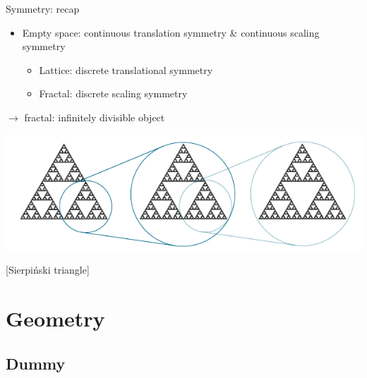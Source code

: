 \documentclass[xcolor=x11names,compress,professionalfonts]{beamer}
\renewcommand{\(}{\begin{columns}}
\renewcommand{\)}{\end{columns}}
\newcommand{\<}[1]{\begin{column}{#1}}
\renewcommand{\>}{\end{column}}
\begin{document}
\begin{frame}{Symmetry: recap}
    \begin{itemize}
        \item Empty space: continuous translation symmetry \& continuous scaling symmetry
            \begin{itemize}
                \item Lattice: discrete translational symmetry
                \item Fractal: discrete scaling symmetry
            \end{itemize}
    \end{itemize}
    
    $\rightarrow$ fractal: infinitely divisible object
    
    {
    
    \centering
    \includegraphics[scale=1.00]{sierpinski.pdf}
    \scriptsize
    
    [Sierpiński triangle]
    
    }
\end{frame}

\section{Geometry}
\subsection{Dummy}
\end{document}
